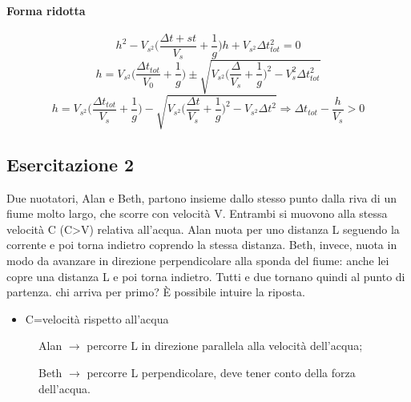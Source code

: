 \documentclass{book}
\begin{document}
\paragraph{Forma ridotta\label{forma ridotta es.1.1}}
\begin{equation*}
	h^2-V_{s^2}\bigg(\frac{\Delta t+st}{V_s}+\frac{1}{g}\bigg)h+V_{s^2}\Delta t_{tot}^2=0
\end{equation*}
\begin{equation*}
	h=V_{s^2}\bigg(\frac{\Delta t_{tot}}{V_0}+\frac{1}{g}\bigg)\pm \sqrt{V_{s^2}\bigg(\frac{\Delta}{V_s}+\frac{1}{g}\bigg)^2-V^2_s\Delta t^2_{tot}}
\end{equation*}
\begin{equation*}
	h=V_{s^2}\bigg(\frac{\Delta t_{tot}}{V_s}+\frac{1}{g}\bigg)-\sqrt{V_{s^2}\bigg(\frac{\Delta t}{V_s}+\frac{1}{g}\bigg)^2-V_{s^2}\Delta t^2}\Rightarrow \Delta t_{tot}-\frac{h}{V_s}>0
\end{equation*}
\subsection{Esercitazione 2}
Due nuotatori, Alan e Beth, partono insieme dallo stesso punto dalla riva di un fiume molto largo, che scorre con velocità V. Entrambi si muovono alla stessa velocità C (C>V) relativa all'acqua. Alan nuota per uno distanza L seguendo la corrente e poi torna indietro coprendo la stessa distanza. Beth, invece, nuota in modo da avanzare in direzione perpendicolare alla sponda del fiume: anche lei copre una distanza L e poi torna indietro. Tutti e due tornano quindi al punto di partenza. chi arriva per primo?
È possibile intuire la riposta.
\begin{itemize}
	\item  C=velocità rispetto all'acqua
\end{itemize}
\begin{description}
	\item[ ] Alan $\to$ percorre L in direzione parallela alla velocità dell'acqua;
	\item[ ] Beth $\to$ percorre L perpendicolare, deve tener conto della forza dell'acqua.
\end{description}
\end{document}
